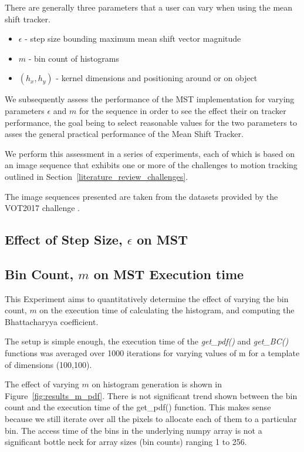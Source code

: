 There are generally three parameters that a user can vary when using the mean
shift tracker. 
\begin{itemize}
    \item $\epsilon$ - step size bounding maximum mean shift vector magnitude
    \item $m$ - bin count of histograms
    \item $(h_x,h_y)$ - kernel dimensions and positioning around or on object
\end{itemize}
We subsequently assess the performance of the MST implementation
for varying parameters $\epsilon$ and $m$ for the sequence in order to see the
effect their on tracker performance, the goal being to select reasonable values
for the two parameters to asses the general practical performance of the Mean
Shift Tracker. 

We perform this assessment in a series of experiments, each of which is based on an image
sequence that exhibits one or more of the challenges to motion tracking outlined
in Section~\ref{literature_review_challenges}. 
 
The image sequences presented are taken from the datasets provided by the VOT2017
challenge \cite{VOT_TPAMI}.


\subsection{Effect of Step Size, $\epsilon$ on MST}\label{results_eps}


\subsection{Bin Count, $m$ on MST Execution time}\label{results_m}
This Experiment aims to quantitatively determine the effect of varying the
bin count, $m$ on the execution time of calculating the histogram, and computing
the Bhattacharyya coefficient.

The setup is simple enough, the execution time of the \textit{get\_pdf()} and
\textit{get\_BC()} functions was averaged over 1000 iterations for varying
values of m for a template of dimensions (100,100).

The effect of varying $m$ on histogram generation is shown in
Figure~\ref{fig:results_m_pdf}. There is not significant trend shown between the
bin count and the execution time of the get\_pdf() function. This makes sense
because we still iterate over all the pixels to allocate each of them to a
particular bin. The access time of the bins in the underlying numpy array is not
a significant bottle neck for array sizes (bin counts) ranging 1 to 256.

